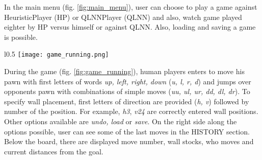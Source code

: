 In the main menu (fig. \ref{fig:main_menu}), user can choose to play a game
against HeuristicPlayer (HP) or QLNNPlayer (QLNN) and also, watch game played
eighter by HP versus himself or against QLNN. Also, loading and saving a game
is possible.

\begin{wrapfigure}{l}{0.5\textwidth}
  \vspace*{-0.35cm}
  \centering
  \texttt{[image: game\_running.png]}
  \vspace*{-0.30cm}
  \caption{game running}
  \label{fig:game_running}
  \vspace*{-0.60cm}
\end{wrapfigure}

During the game (fig. \ref{fig:game_running}), human players enters to move his
pawn with first letters of words \textit{up, left, right, down}
(\textit{u, l, r, d}) and jumps over opponents pawn with combinations of simple
moves (\textit{uu, ul, ur, dd, dl, dr}). To specify wall placement, first
letters of direction are provided (\textit{h, v}) followed by number
of the position.  For example, \textit{h3}, \textit{v24} are correctly entered
wall positions. Other options available are \textit{undo, load} or
\textit{save}. On the right side along the options possible, user can see some
of the last moves in the HISTORY section. Below the board, there are displayed
move number, wall stocks, who moves and current distances from the goal.


% 
% 

% 
% 

